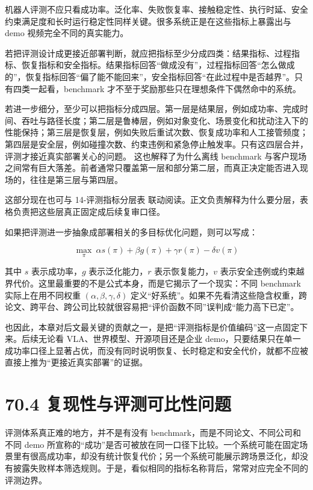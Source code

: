机器人评测不应只看成功率。泛化率、失败恢复率、接触稳定性、执行时延、安全约束满足度和长时运行稳定性同样关键。很多系统正是在这些指标上暴露出与 demo 视频完全不同的真实能力。

若把评测设计成更接近部署判断，就应把指标至少分成四类：结果指标、过程指标、恢复指标和安全指标。结果指标回答“做成没有”，过程指标回答“怎么做成的”，恢复指标回答“偏了能不能回来”，安全指标回答“在此过程中是否越界”。只有四类一起看，benchmark 才不至于奖励那些只在理想条件下偶然命中的系统。

若进一步细分，至少可以把指标分成四层。第一层是结果层，例如成功率、完成时间、吞吐与路径长度；第二层是鲁棒层，例如对象变化、场景变化和扰动注入下的性能保持；第三层是恢复层，例如失败后重试次数、恢复成功率和人工接管频度；第四层是安全层，例如碰撞次数、约束违例和紧急停止触发率。只有这四层合并，评测才接近真实部署关心的问题。 这也解释了为什么离线 benchmark 与客户现场之间常有巨大落差。前者通常只覆盖第一层和部分第二层，而真正决定能否进入现场的，往往是第三层与第四层。

这部分现在也可与 14-评测指标分层表 联动阅读。正文负责解释为什么要分层，表格负责把这些层真正固定成后续复审口径。

如果把评测进一步抽象成部署相关的多目标优化问题，则可以写成：

\begingroup
\footnotesize
\begin{equation*}
\max_{\pi} \ \alpha s(\pi) + \beta g(\pi) + \gamma r(\pi) - \delta v(\pi)
\end{equation*}
\endgroup

其中 \(s\) 表示成功率，\(g\) 表示泛化能力，\(r\) 表示恢复能力，\(v\) 表示安全违例或约束越界代价。这里最重要的不是公式本身，而是它揭示了一个现实：不同 benchmark 实际上在用不同权重 \((\alpha,\beta,\gamma,\delta)\) 定义“好系统”。如果不先看清这些隐含权重，跨论文、跨平台、跨公司比较就很容易把“评价函数不同”误判成“能力高下已定”。

也因此，本章对后文最关键的贡献之一，是把“评测指标是价值编码”这一点固定下来。后续无论看 VLA、世界模型、开源项目还是企业 demo，只要结果只在单一成功率口径上显著占优，而没有同时说明恢复、长时稳定和安全代价，就都不应被直接上推为“更接近真实部署”的证据。

\section*{70.4 复现性与评测可比性问题}


评测体系真正难的地方，并不是有没有 benchmark，而是不同论文、不同公司和不同 demo 所宣称的“成功”是否可被放在同一口径下比较。一个系统可能在固定场景里有很高成功率，却没有统计恢复代价；另一个系统可能展示跨场景泛化，却没有披露失败样本筛选规则。于是，看似相同的指标名称背后，常常对应完全不同的评测边界。


